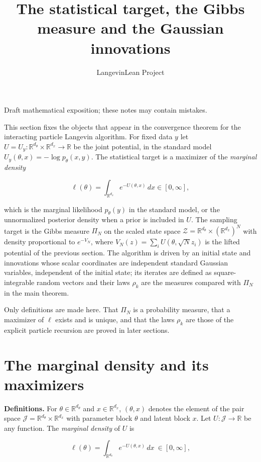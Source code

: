 \documentclass[11pt,a4paper]{article}
\title{\texorpdfstring{The statistical target, the Gibbs measure and the Gaussian innovations}{The statistical target, the Gibbs measure and the Gaussian innovations}}
\author{LangevinLean Project}
\date{}
\begin{document}
\maketitle
Draft mathematical exposition; these notes may contain mistakes.


This section fixes the objects that appear in the convergence theorem for the interacting particle Langevin algorithm. For fixed data \(y\) let \(U=U_y:\mathbb R^{d_\theta}\times\mathbb R^{d_x}\to\mathbb R\) be the joint potential, in the standard model \(U_y(\theta,x)=-\log p_\theta(x,y)\). The statistical target is a maximizer of the \emph{marginal density}


\[\ell(\theta)=\int_{\mathbb R^{d_x}}e^{-U(\theta,x)}\,dx\in[0,\infty],\]


which is the marginal likelihood \(p_\theta(y)\) in the standard model, or the unnormalized posterior density when a prior is included in \(U\). The sampling target is the Gibbs measure \(\Pi_N\) on the scaled state space \(\mathcal Z=\mathbb R^{d_\theta}\times(\mathbb R^{d_x})^N\) with density proportional to \(e^{-V_N}\), where \(V_N(z)=\sum_iU(\theta,\sqrt Nz_i)\) is the lifted potential of the previous section. The algorithm is driven by an initial state and innovations whose scalar coordinates are independent standard Gaussian variables, independent of the initial state; its iterates are defined as square-integrable random vectors and their laws \(\rho_k\) are the measures compared with \(\Pi_N\) in the main theorem.




Only definitions are made here. That \(\Pi_N\) is a probability measure, that a maximizer of \(\ell\) exists and is unique, and that the laws \(\rho_k\) are those of the explicit particle recursion are proved in later sections.


\section{\texorpdfstring{The marginal density and its maximizers}{The marginal density and its maximizers}}


\textbf{Definitions.} For \(\theta\in\mathbb R^{d_\theta}\) and \(x\in\mathbb R^{d_x}\), \((\theta,x)\) denotes the element of the pair space \(\mathcal J=\mathbb R^{d_\theta}\times\mathbb R^{d_x}\) with parameter block \(\theta\) and latent block \(x\). Let \(U:\mathcal J\to\mathbb R\) be any function. The \emph{marginal density} of \(U\) is


\[\ell(\theta)=\int_{\mathbb R^{d_x}}e^{-U(\theta,x)}\,dx\ \in[0,\infty],\]
\end{document}
